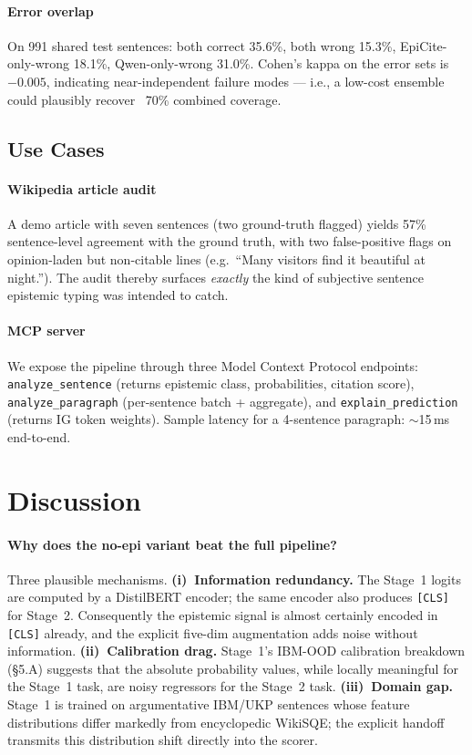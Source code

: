 \documentclass[conference]{IEEEtran}
\begin{document}
\paragraph{Error overlap}
On 991 shared test sentences: both correct 35.6\%, both wrong 15.3\%,
EpiCite-only-wrong 18.1\%, Qwen-only-wrong 31.0\%. Cohen's kappa on the
error sets is $-0.005$, indicating near-independent failure modes ---
i.e., a low-cost ensemble could plausibly recover ~70\% combined coverage.

\subsection{Use Cases}

\paragraph{Wikipedia article audit}
A demo article with seven sentences (two ground-truth flagged) yields
57\% sentence-level agreement with the ground truth, with two
false-positive flags on opinion-laden but non-citable lines (e.g.\ ``Many
visitors find it beautiful at night.''). The audit thereby surfaces
\emph{exactly} the kind of subjective sentence epistemic typing was
intended to catch.

\paragraph{MCP server}
We expose the pipeline through three Model Context Protocol endpoints:
\texttt{analyze\_sentence} (returns epistemic class, probabilities,
citation score), \texttt{analyze\_paragraph} (per-sentence batch +
aggregate), and \texttt{explain\_prediction} (returns IG token weights).
Sample latency for a 4-sentence paragraph: $\sim$15\,ms end-to-end.

\section{Discussion}
\label{sec:discussion}

\paragraph{Why does the no-epi variant beat the full pipeline?}
Three plausible mechanisms.
\textbf{(i)~Information redundancy.} The Stage~1 logits are computed by a
DistilBERT encoder; the same encoder also produces \texttt{[CLS]} for
Stage~2. Consequently the epistemic signal is almost certainly encoded in
\texttt{[CLS]} already, and the explicit five-dim augmentation adds noise
without information.
\textbf{(ii)~Calibration drag.} Stage~1's IBM-OOD calibration
breakdown (\S5.A) suggests that the absolute probability values, while
locally meaningful for the Stage~1 task, are noisy regressors for the
Stage~2 task.
\textbf{(iii)~Domain gap.} Stage~1 is trained on argumentative IBM/UKP
sentences whose feature distributions differ markedly from
encyclopedic WikiSQE; the explicit handoff transmits this distribution
shift directly into the scorer.
\end{document}
